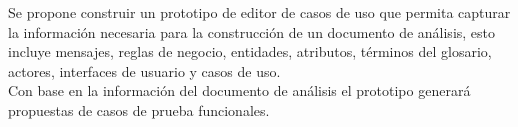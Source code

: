 Se propone construir un prototipo de editor de casos de uso que permita capturar la información necesaria para la construcción de un documento de análisis, esto incluye mensajes, reglas de negocio, entidades, atributos, términos del glosario, actores, interfaces de usuario y casos de uso.\\
Con base en la información del documento de análisis el prototipo generará propuestas de casos de prueba funcionales.
\vspace{1cm}




